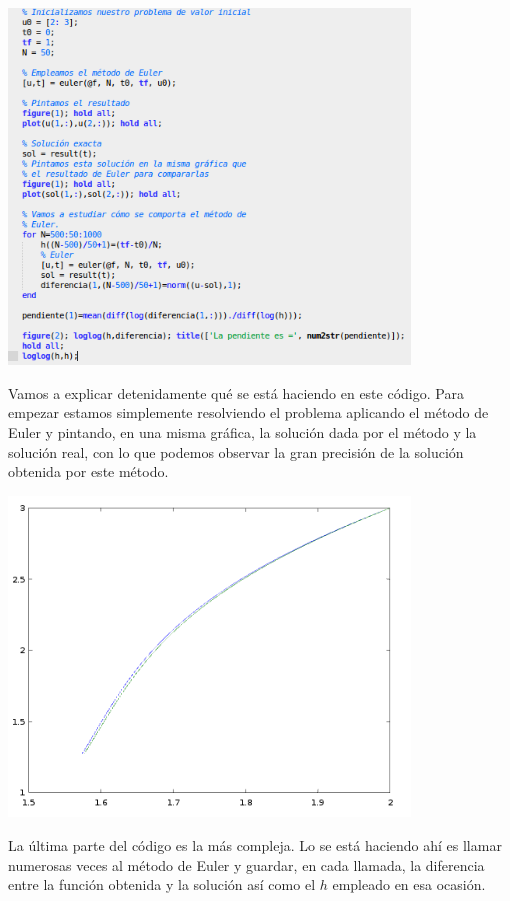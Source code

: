 \begin{center}
\includegraphics[width=0.8\textwidth]{img/aplicacion_euler.png}
\end{center}

Vamos a explicar detenidamente qué se está haciendo en este código. Para empezar estamos simplemente resolviendo el problema aplicando el método de Euler y pintando, en una misma gráfica, la solución dada por el método y la solución real, con lo que podemos observar la gran precisión de la solución obtenida por este método.
\begin{center}
\includegraphics[width=0.8\textwidth]{img/figure1.png}
\end{center}

La última parte del código es la más compleja. Lo se está haciendo ahí es llamar numerosas veces al método de Euler y guardar, en cada llamada, la diferencia entre la función obtenida y la solución así como el $h$ empleado en esa ocasión.

